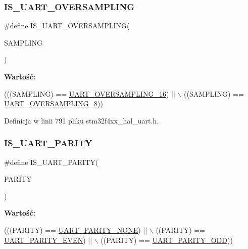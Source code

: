 \subsubsection{\texorpdfstring{I\+S\+\_\+\+U\+A\+R\+T\+\_\+\+O\+V\+E\+R\+S\+A\+M\+P\+L\+I\+NG}{IS\_UART\_OVERSAMPLING}}
{\footnotesize\ttfamily \#define I\+S\+\_\+\+U\+A\+R\+T\+\_\+\+O\+V\+E\+R\+S\+A\+M\+P\+L\+I\+NG(\begin{DoxyParamCaption}\item[{}]{S\+A\+M\+P\+L\+I\+NG }\end{DoxyParamCaption})}

{\bfseries Wartość\+:}
\begin{DoxyCode}
(((SAMPLING) == \hyperlink{group___u_a_r_t___over___sampling_gaa6a320ec65d248d76f21de818db1a2f0}{UART\_OVERSAMPLING\_16}) || \(\backslash\)
                                        ((SAMPLING) == \hyperlink{group___u_a_r_t___over___sampling_gaeb13896e8bdc1bb041e01a86a868ee0b}{UART\_OVERSAMPLING\_8}))
\end{DoxyCode}


Definicja w linii 791 pliku stm32f4xx\+\_\+hal\+\_\+uart.\+h.

\mbox{\label{group___u_a_r_t___private___macros_gaf2f542d273738ee3cb4a93d169827744}} 
\subsubsection{\texorpdfstring{I\+S\+\_\+\+U\+A\+R\+T\+\_\+\+P\+A\+R\+I\+TY}{IS\_UART\_PARITY}}
{\footnotesize\ttfamily \#define I\+S\+\_\+\+U\+A\+R\+T\+\_\+\+P\+A\+R\+I\+TY(\begin{DoxyParamCaption}\item[{}]{P\+A\+R\+I\+TY }\end{DoxyParamCaption})}

{\bfseries Wartość\+:}
\begin{DoxyCode}
(((PARITY) == \hyperlink{group___u_a_r_t___parity_ga270dea6e1a92dd83fe58802450bdd60c}{UART\_PARITY\_NONE}) || \(\backslash\)
                                ((PARITY) == \hyperlink{group___u_a_r_t___parity_ga063b14ac42ef9e8f4246c17a586b14eb}{UART\_PARITY\_EVEN}) || \(\backslash\)
                                ((PARITY) == \hyperlink{group___u_a_r_t___parity_ga229615e64964f68f7a856ea6ffea359e}{UART\_PARITY\_ODD}))
\end{DoxyCode}


